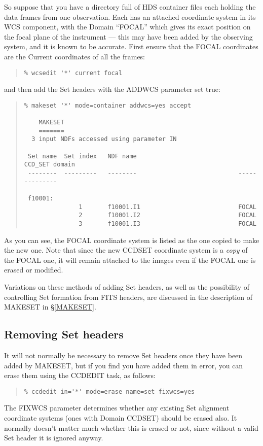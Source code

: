 \documentclass[twoside,11pt]{article}
\newcommand{\hyperref}[4]{#2\ref{#4}#3}
\newcommand{\htmlref}[2]{#1}
\renewcommand{\_}{\texttt{\symbol{95}}}
\newenvironment{myquote}{\begin{quote}\begin{small}}{\end{small}\end{quote}}
\newcommand{\routine}[1]{{\sc #1}}
\newcommand{\xroutine}[1]{\htmlref{{\sc #1}}{#1}}
\begin{document}
So suppose that you have a directory full of HDS container files
each holding the data frames from one observation.
Each has an attached coordinate system in its WCS component,
with the Domain ``FOCAL'' which gives its exact position on the focal 
plane of the instrument --- this may have been added by the observing
system, and it is known to be accurate.
First ensure that the FOCAL coordinates are the Current coordinates
of all the frames:
\begin{myquote}
\begin{verbatim}
% wcsedit '*' current focal
\end{verbatim}
\end{myquote}
and then add the Set headers with the ADDWCS parameter set true:
\begin{myquote}
\begin{verbatim}
% makeset '*' mode=container addwcs=yes accept

    MAKESET
    =======
  3 input NDFs accessed using parameter IN

 Set name  Set index   NDF name                            CCD_SET domain
 --------  ---------   --------                            --------------

 f10001:
               1       f10001.I1                           FOCAL  
               2       f10001.I2                           FOCAL  
               3       f10001.I3                           FOCAL  
\end{verbatim}
\end{myquote}
As you can see, the FOCAL coordinate system is listed as the one copied to
make the new one.
Note that since the new CCD\_SET coordinate system is a {\em copy\/}
of the FOCAL one, it will
remain attached to the images even if the FOCAL one is erased or modified.

Variations on these methods of adding Set headers, as well as the
possibility of controlling Set formation from FITS headers,
are discussed in the description of \routine{MAKESET}
in \hyperref{the appendix}{\S}{}{MAKESET}.


\subsection{Removing Set headers}

It will not normally be necessary to remove Set headers once they
have been added by \xroutine{MAKESET}, but if you find you have
added them in error, you can erase them using the \xroutine{CCDEDIT}
task, as follows:
\begin{myquote}
\begin{verbatim}
% ccdedit in='*' mode=erase name=set fixwcs=yes
\end{verbatim}
\end{myquote}
The FIXWCS parameter determines whether any existing Set alignment
coordinate systems (ones with Domain CCD\_SET) should be erased also.
It normally doesn't matter much whether this is erased or not,
since without a valid Set header it is ignored anyway.
\end{document}
